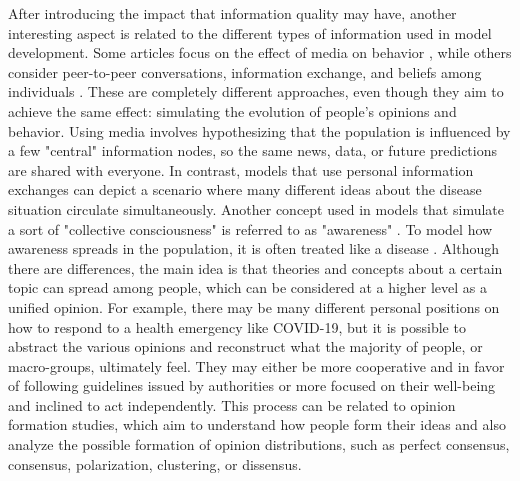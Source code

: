 After introducing the impact that information quality may have, another interesting aspect is related to the different types of information used in model development. Some articles focus on the effect of media on behavior \cite{Collinson2014, Misra_2011}, while others consider peer-to-peer conversations, information exchange, and beliefs among individuals \cite{Tyson_2020}. These are completely different approaches, even though they aim to achieve the same effect: simulating the evolution of people's opinions and behavior. Using media involves hypothesizing that the population is influenced by a few "central" information nodes, so the same news, data, or future predictions are shared with everyone. In contrast, models that use personal information exchanges can depict a scenario where many different ideas about the disease situation circulate simultaneously.
Another concept used in models that simulate a sort of "collective consciousness" is referred to as "awareness" \cite{Funk2009}. To model how awareness spreads in the population, it is often treated like a disease \cite{Silva2019, Granell_2013, Granell2014, Kabir_2019, Zuo_2021, Wang_2019}. Although there are differences, the main idea is that theories and concepts about a certain topic can spread among people, which can be considered at a higher level as a unified opinion. For example, there may be many different personal positions on how to respond to a health emergency like COVID-19, but it is possible to abstract the various opinions and reconstruct what the majority of people, or macro-groups, ultimately feel. They may either be more cooperative and in favor of following guidelines issued by authorities or more focused on their well-being and inclined to act independently.
This process can be related to opinion formation studies, which aim to understand how people form their ideas \cite{Devia_2023, Devia2022} and also analyze the possible formation of opinion distributions, such as perfect consensus, consensus, polarization, clustering, or dissensus.